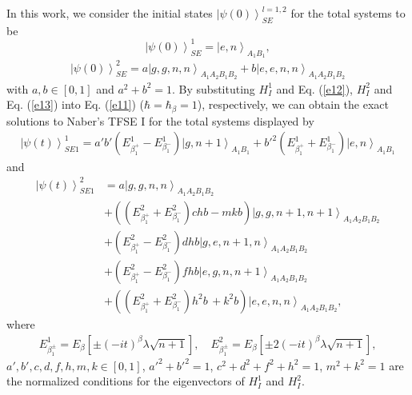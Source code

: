 \documentclass[
showpacs,  %
showkeys,  %
aps,       %
amsthm,    %
amsmath,   %
amsfonts,  %
amssymb    %
]{revtex4-1}          %
\begin{document}
In this work, we consider the initial states $\left|{\psi(0)}\right\rangle_{SE}^{l=1, 2}$ for the total systems to be
\begin{equation}
\label{e12}
{\left|{\psi(0)}\right\rangle_{SE}^{1}} = {\left|{e,n}\right\rangle_{{A_1}{B_1}}},
\end{equation}
\begin{equation}
\label{e13}
\begin{aligned}
{\left|{\psi(0)}\right\rangle_{SE}^{2}}=a{\left|{g,g,n,n}\right\rangle_{{A_1}{A_2}{B_1}{B_2}}} + b{\left|{e,e,n,n} \right\rangle_{{A_1}{A_2}{B_1}{B_2}}}
\end{aligned}
\end{equation}
with $a,b \in \left[ {0,1} \right]$ and $a^2+b^2=1$. By substituting ${H^1_I}$ and Eq. (\ref{e12}),
${H^2_I}$ and Eq. (\ref{e13}) into Eq. (\ref{e11}) ($\hbar = {\hbar_\beta }=1$), respectively, we can obtain the exact solutions to Naber's TFSE I for the total systems displayed by
\begin{equation}
\label{e14}
\begin{aligned}
{\left|{\psi(t)} \right\rangle_{SE1}^{1}}=a'b'({E_{\beta_1^ + }^1}-{E_{\beta_1^ - }^1}){\left| {g,n + 1} \right\rangle_{{A_1}{B_1}}}+{{b'}^2}({E_{\beta_1^ + }^1}+{E_{\beta_1^ - }^1}){\left|{e,n} \right\rangle_{{A_1}{B_1}}}
\end{aligned}
\end{equation}
and
\begin{equation}
\label{e15}
\begin{aligned}
{\left|{\psi(t)} \right\rangle_{SE1}^{2}} &= a{\left| {g,g,n,n} \right\rangle_{{A_1}{A_2}{B_1}{B_2}}}\\
&+(({E_{\beta_1^ + }^2}+{E_{\beta_1^ - }^2})chb - mkb){\left| {g,g,n + 1,n + 1} \right\rangle _{{A_1}{A_2}{B_1}{B_2}}}\\
&+ ({E_{\beta_1^ + }^2}-{E_{\beta_1^ - }^2})dhb{\left| {g,e,n + 1,n} \right\rangle _{{A_1}{A_2}{B_1}{B_2}}}\\
&+ ({E_{\beta_1^ + }^2}-{E_{\beta_1^ - }^2})fhb{\left| {e,g,n,n + 1} \right\rangle _{{A_1}{A_2}{B_1}{B_2}}}\,\\
&+ (({E_{\beta_1^ + }^2}+{E_{\beta_1^ - }^2}){h^2}b\, + {k^2}b){\left| {e,e,n,n} \right\rangle _{{A_1}{A_2}{B_1}{B_2}}},
\end{aligned}
\end{equation}
where
\begin{equation}
\label{e16}
\begin{aligned}
E_{\beta_1^\pm}^1 = {E_\beta }\left[{\pm {{(-it)}^\beta}\lambda\sqrt {n+1}}\right],\,\,\,\,\,\,
E_{\beta_1^\pm}^2 = {E_\beta}\left[{\pm 2{{(-it)}^\beta}\lambda \sqrt {n+1}}\right],
\end{aligned}
\end{equation}
$a',b',c,d,f,h,m,k\in[0,1]$, ${a'}^2+{b'}^2=1$, ${c^2}+{d^2}+{f^2}+{h^2}=1$, ${m^2}+{k^2}=1$ are the normalized conditions for the eigenvectors of ${H^1_I}$ and ${H^2_I}$.
\end{document}
